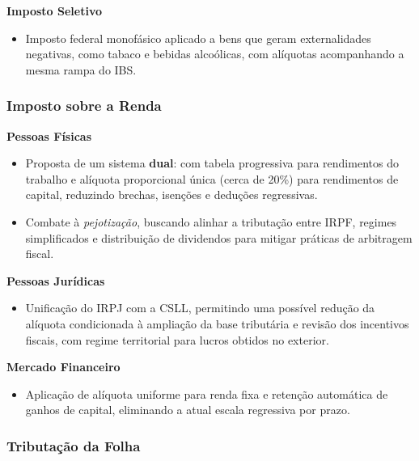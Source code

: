 \documentclass[a4paper,12pt]{article}[abntex2]
\begin{document}
\textbf{Imposto Seletivo}

\begin{itemize}
  \item Imposto federal monofásico aplicado a bens que geram externalidades negativas, como tabaco e bebidas alcoólicas, com alíquotas acompanhando a mesma rampa do IBS.
\end{itemize}

\subsubsection{\textbf{Imposto sobre a Renda}}

\textbf{Pessoas Físicas}

\begin{itemize}
  \item Proposta de um sistema \textbf{dual}: com tabela progressiva para rendimentos do trabalho e alíquota proporcional única (cerca de 20\%) para rendimentos de capital, reduzindo brechas, isenções e deduções regressivas.
  \item Combate à \emph{pejotização}, buscando alinhar a tributação entre IRPF, regimes simplificados e distribuição de dividendos para mitigar práticas de arbitragem fiscal.
\end{itemize}

\textbf{Pessoas Jurídicas}

\begin{itemize}
  \item Unificação do IRPJ com a CSLL, permitindo uma possível redução da alíquota condicionada à ampliação da base tributária e revisão dos incentivos fiscais, com regime territorial para lucros obtidos no exterior.
\end{itemize}

\textbf{Mercado Financeiro}

\begin{itemize}
  \item Aplicação de alíquota uniforme para renda fixa e retenção automática de ganhos de capital, eliminando a atual escala regressiva por prazo.
\end{itemize}

\subsubsection{\textbf{Tributação da Folha}}
\end{document}
